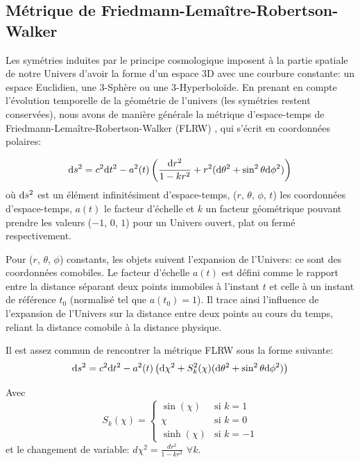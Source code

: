 \documentclass[../main/main.tex]{subfiles}
\begin{document}
\subsection{Métrique de Friedmann-Lemaître-Robertson-Walker}\label{ssec:FLRW}

Les symétries induites par le principe cosmologique imposent à la partie
spatiale de notre Univers d'avoir la forme d'un espace 3D avec une
courbure constante: un espace Euclidien, une 3-Sphère ou une
3-Hyperboloïde. En prenant en compte l'évolution temporelle de la
géométrie de l'univers (les symétries restent conservées), nous avons de
manière générale la métrique d'espace-temps de Friedmann-Lemaître-Robertson-Walker (FLRW)
\citep{Friedmann1922,Lemaitre1933,Robertson1936,Walker1937}, qui s'écrit
en coordonnées polaires:

\begin{equation}
  \label{eq:FLRW}
  \mathrm{d} s^{2}=c^{2}\mathrm{d} t^{2}-a^{2}(t)\left( \frac{\mathrm{d} r^{2}}{1-kr^{2}}+r^{2}(\mathrm{d}\theta^{2}+\sin^{2}\theta\mathrm{d}\phi^{2})\right)
\end{equation}
où $\mathrm{d} s^{2}$ est un élément infinitésiment d'espace-temps, ($r$,
$\theta$, $\phi$, $t$) les coordonnées d'espace-temps, $a(t)$ le
facteur d'échelle et $k$ un facteur géométrique pouvant prendre les
valeurs ($-1$, $0$, $1$) pour un Univers ouvert, plat ou fermé
respectivement.

Pour ($r$, $\theta$, $\phi$) constants, les objets
suivent l'expansion de l'Univers: ce sont des coordonnées comobiles.
Le facteur d'échelle $a(t)$ est défini comme le rapport entre la
distance séparant deux points immobiles à l'instant $t$ et celle à un
instant de référence $t_{0}$ (normalisé tel que $a(t_{0})=1$). Il trace
ainsi l'influence de l'expansion de l'Univers sur la distance entre deux
points au cours du temps, reliant la distance comobile à la distance
physique.

Il est assez commun de rencontrer la métrique FLRW sous la forme
suivante:
\begin{equation}
  \label{eq:FLRW2}
  \mathrm{d} s^{2}=c^{2}\mathrm{d} t^{2}-a^{2}(t) \left( \mathrm{d}\chi^{2}+S^{2}_{k}(\chi)(\mathrm{d}\theta^{2}+\sin^{2}\theta \mathrm{d}\phi^{2}) \right)
\end{equation}

Avec 
\begin{equation}
  \label{eq:chiflrw}
  S_{k}(\chi) =
  \begin{cases}
        \sin(\chi) & \text{si }  k=1 \\
        \chi & \text{si }  k=0 \\
        \sinh(\chi) & \text{si }  k=-1
    \end{cases}
\end{equation}
et le changement de variable:  $d\chi^{2}=\frac{dr^{2}}{1-kr^{2}}$ $\forall k$.
\end{document}

